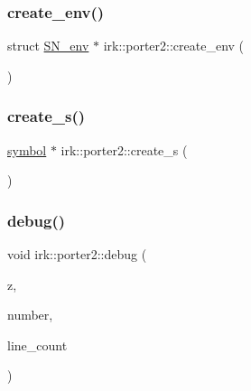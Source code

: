 \mbox{\label{namespaceirk_1_1porter2_a8ba24ffb1a390ffd49feb3350a538559}} 
\subsubsection{\texorpdfstring{create\+\_\+env()}{create\_env()}}
{\footnotesize\ttfamily struct \mbox{\hyperlink{structirk_1_1porter2_1_1SN__env}{S\+N\+\_\+env}} $\ast$ irk\+::porter2\+::create\+\_\+env (\begin{DoxyParamCaption}\item[{void}]{ }\end{DoxyParamCaption})}

\mbox{\label{namespaceirk_1_1porter2_ae4f10211c905eac3b423e5f924798327}} 
\subsubsection{\texorpdfstring{create\+\_\+s()}{create\_s()}}
{\footnotesize\ttfamily \mbox{\hyperlink{namespaceirk_1_1porter2_afd04c4eb58a1dabcf8f3ab2d7e9f9ed5}{symbol}} $\ast$ irk\+::porter2\+::create\+\_\+s (\begin{DoxyParamCaption}\item[{void}]{ }\end{DoxyParamCaption})}

\mbox{\label{namespaceirk_1_1porter2_a67c11f4c80bba50ebd7decdadc48f0a8}} 
\subsubsection{\texorpdfstring{debug()}{debug()}}
{\footnotesize\ttfamily void irk\+::porter2\+::debug (\begin{DoxyParamCaption}\item[{struct \mbox{\hyperlink{structirk_1_1porter2_1_1SN__env}{S\+N\+\_\+env}} $\ast$}]{z,  }\item[{int}]{number,  }\item[{int}]{line\+\_\+count }\end{DoxyParamCaption})}

